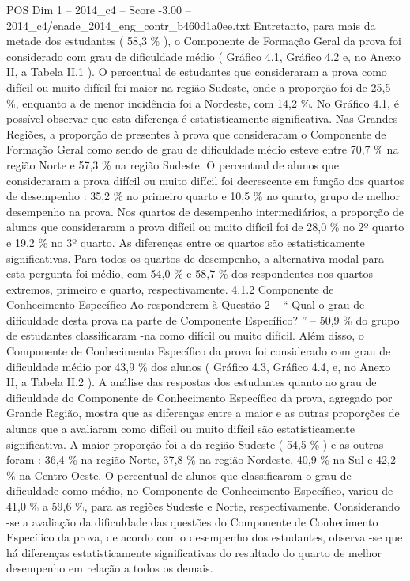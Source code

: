 \begin{textsample}{POS Dim 1 – 2014\_c4 – Score -3.00 – 2014\_c4/enade\_2014\_eng\_contr\_b460d1a0ee.txt}
Entretanto, para mais da metade dos estudantes ( 58,3 \% ), o Componente de Formação Geral da prova foi considerado com grau de dificuldade médio ( Gráfico 4.1, Gráfico 4.2 e, no Anexo II, a Tabela II.1 ).
O percentual de estudantes que consideraram a prova como difícil ou muito difícil foi maior na região Sudeste, onde a proporção foi de 25,5 \%, enquanto a de menor incidência foi a Nordeste, com 14,2 \%.
No Gráfico 4.1, é possível observar que esta diferença é estatisticamente significativa.
Nas Grandes Regiões, a proporção de presentes à prova que consideraram o Componente de Formação Geral como sendo de grau de dificuldade médio esteve entre 70,7 \% na região Norte e 57,3 \% na região Sudeste.
O percentual de alunos que consideraram a prova difícil ou muito difícil foi decrescente em função dos quartos de desempenho : 35,2 \% no primeiro quarto e 10,5 \% no quarto, grupo de melhor desempenho na prova.
Nos quartos de desempenho intermediários, a proporção de alunos que consideraram a prova difícil ou muito difícil foi de 28,0 \% no 2º quarto e 19,2 \% no 3º quarto.
As diferenças entre os quartos são estatisticamente significativas.
Para todos os quartos de desempenho, a alternativa modal para esta pergunta foi médio, com 54,0 \% e 58,7 \% dos respondentes nos quartos extremos, primeiro e quarto, respectivamente. 4.1.2 Componente de Conhecimento Específico Ao responderem à Questão 2 – “ Qual o grau de dificuldade desta prova na parte de Componente Específico? ” – 50,9 \% do grupo de estudantes classificaram -na como difícil ou muito difícil.
Além disso, o Componente de Conhecimento Específico da prova foi considerado com grau de dificuldade médio por 43,9 \% dos alunos ( Gráfico 4.3, Gráfico 4.4, e, no Anexo II, a Tabela II.2 ).
A análise das respostas dos estudantes quanto ao grau de dificuldade do Componente de Conhecimento Específico da prova, agregado por Grande Região, mostra que as diferenças entre a maior e as outras proporções de alunos que a avaliaram como difícil ou muito difícil são estatisticamente significativa.
A maior proporção foi a da região Sudeste ( 54,5 \% ) e as outras foram : 36,4 \% na região Norte, 37,8 \% na região Nordeste, 40,9 \% na Sul e 42,2 \% na Centro-Oeste.
O percentual de alunos que classificaram o grau de dificuldade como médio, no Componente de Conhecimento Específico, variou de 41,0 \% a 59,6 \%, para as regiões Sudeste e Norte, respectivamente.
Considerando -se a avaliação da dificuldade das questões do Componente de Conhecimento Específico da prova, de acordo com o desempenho dos estudantes, observa -se que há diferenças estatisticamente significativas do resultado do quarto de melhor desempenho em relação a todos os demais.

\end{textsample}
